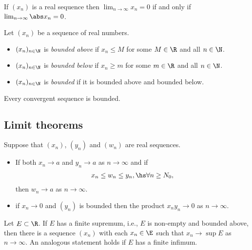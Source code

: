 \documentclass{article}
\begin{document}
\begin{lemma}
    If $(x_n)$ is a real sequence then $\lim_{n\to\infty}x_n=0$ if and only if $\lim_{n\to\infty}\abs x_n = 0$.
\end{lemma}

\begin{definition}
    Let $(x_n)$ be a sequence of real numbers.
    \begin{itemize}
        \item $(x_n)_{n\in\N}$ is \emph{bounded above} if $x_n\leq M$ for some $M\in\R$ and all $n\in\N$.
        \item $(x_n)_{n\in\N}$ is \emph{bounded below} if $x_n\geq m$ for some $m\in\R$ and all $n\in\N$.
        \item $(x_n)_{n\in\N}$ is \emph{bounded} if it is bounded above and bounded below.
    \end{itemize}
\end{definition}

\begin{theorem}
    Every convergent sequence is bounded.
\end{theorem}

\subsection{Limit theorems}

\begin{theorem}
    Suppose that $(x_n)$, $(y_n)$ and $(w_n)$ are real sequences.
    \begin{itemize}
        \item If both $x_n\to a$ and $y_n\to a$ as $n\to \infty$ and if \begin{align*}
            x_n\leq w_n\leq y_n,\hs \forall n\geq N_0,
        \end{align*}
        then $w_n\to a$ as $n\to\infty$.
        \item if $x_n\to0$ and $(y_n)$ is bounded then the product $x_ny_n\to 0$ as $n\to\infty$.
    \end{itemize}
\end{theorem}

\setcounter{theorem}{2}
\begin{theorem}
    Let $E\subset\R$. If $E$ has a finite supremum, i.e., $E$ is non-empty and bounded above,
    then there is a sequence $(x_n)$ with each $x_n\in\E$ such that $x_n\to\sup E$ as $n\to\infty$.
    An analogous statement holds if $E$ has a finite infimum.
\end{theorem}
\end{document}
